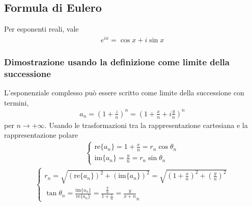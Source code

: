 \documentclass[letterpaper,10pt,italian]{jupyterBook}
\begin{document}
\subsection{Formula di Eulero}
\label{\detokenize{ch/algebra/complex-algebra-notes:formula-di-eulero}}\label{\detokenize{ch/algebra/complex-algebra-notes:math-hs-algebra-complex-notes-euler}}
\sphinxAtStartPar
Per esponenti reali, vale
\begin{equation*}
\begin{split}e^{i x} = \cos x + i \sin x\end{split}
\end{equation*}\subsubsection*{Dimostrazione usando la definizione come limite della successione}

\sphinxAtStartPar
L’esponenziale complesso può essere scritto come limite della successione con termini,
\begin{equation*}
\begin{split}a_n = \left( 1 + \frac{z}{n} \right)^n = \left( 1 + \frac{x}{n} + i \frac{y}{n} \right)^n\end{split}
\end{equation*}
\sphinxAtStartPar
per \(n \rightarrow +\infty\). Usando le trasformazioni tra la rappresentazione cartesiana e la rappresentazione polare
\begin{equation*}
\begin{split}\begin{cases}
  \text{re}\{a_n\} = 1 + \frac{x}{n} = r_n \cos \theta_n \\
  \text{im}\{a_n\} = \frac{y}{n} = r_n \sin \theta_n
\end{cases}\end{split}
\end{equation*}\begin{equation*}
\begin{split}\begin{cases}
  r_n = \sqrt{ \left(\text{re}\{a_n\}\right)^2 + \left(\text{im}\{a_n\}\right)^2 } =  \sqrt{\left(1+ \frac{x}{n}\right)^2 + \left(\frac{y}{n}\right)^2} \\
  \tan \theta_n = \frac{\text{im}\{a_n\}}{\text{re}\{a_n\}} = \frac{\frac{y}{n}}{1 + \frac{x}{n}} = \frac{y}{x + n}_n
\end{cases}\end{split}
\end{equation*}
\end{document}
